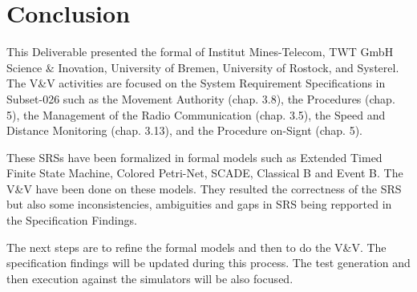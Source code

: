 \documentclass{template/openetcs_article}
\begin{document}







\section{Conclusion}

This Deliverable presented the formal \vv of Institut
Mines-Telecom, TWT GmbH Science \& Inovation, University of Bremen, University of Rostock, and
Systerel.
The V\&V activities are focused on the System Requirement Specifications in
Subset-026 such as the Movement Authority (chap. 3.8), the Procedures (chap. 5),
the Management of the Radio Communication (chap. 3.5), the Speed and Distance
Monitoring (chap. 3.13), and the Procedure on-Signt (chap. 5).

These SRSs have been formalized in formal models such as  Extended Timed Finite
State Machine, Colored Petri-Net, SCADE, Classical B and Event B.
The V\&V have been done on these models. They resulted
the correctness of the SRS but also
some inconsistencies, ambiguities and gaps in SRS being
repported in the Specification Findings.

The next steps are to refine the formal models and then to do the V\&V.
The specification findings will be updated during this process.
The test generation and then execution against the
simulators will be also focused.





%



%
\end{document}
